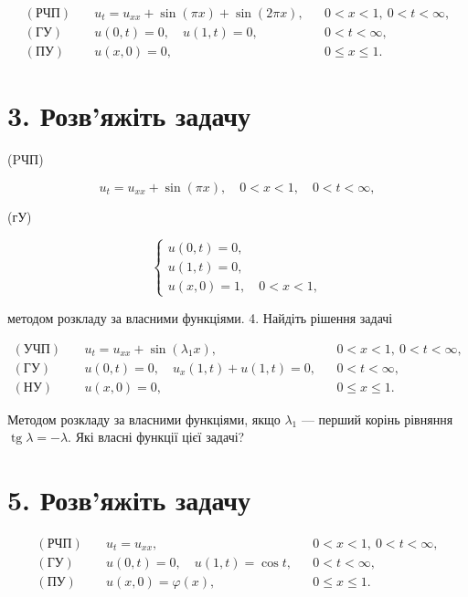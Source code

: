 \documentclass[
  ukrainian,
]{article}
\begin{document}
\[
\begin{aligned}
(\text{РЧП})\quad & u_t = u_{xx} + \sin(\pi x) + \sin(2\pi x), && 0 < x < 1,\ 0 < t < \infty,\\
(\text{ГУ})\quad & u(0,t)=0,\quad u(1,t)=0, && 0 < t < \infty,\\
(\text{ПУ})\quad & u(x,0)=0, && 0 \le x \le 1.
\end{aligned}
\]

\section{3. Розв'яжіть
задачу}\label{ux440ux43eux437ux432ux44fux436ux456ux442ux44c-ux437ux430ux434ux430ux447ux443}

(PЧП)

\[
u_t = u_{xx} + \sin(\pi x), \quad 0 < x < 1, \quad 0 < t < \infty,
\]

(гУ)

\[
\begin{cases} u(0, t) = 0, \\ u(1, t) = 0, \\ u(x, 0) = 1, \quad 0 < x < 1, \end{cases}
\]

методом розкладу за власними функціями. 4. Найдіть рішення задачі

\[
\begin{aligned}
(\text{УЧП})\quad & u_t = u_{xx} + \sin(\lambda_1 x), && 0 < x < 1,\ 0 < t < \infty, \\
(\text{ГУ})\quad & u(0,t) = 0,\quad u_x(1,t) + u(1,t) = 0, && 0 < t < \infty, \\
(\text{НУ})\quad & u(x,0) = 0, && 0 \leqslant x \leqslant 1.
\end{aligned}
\]

Методом розкладу за власними функціями, якщо \(\lambda_1\) --- перший
корінь рівняння \(\operatorname{tg}\lambda = -\lambda\). Які власні
функції цієї задачі?

\section{5. Розв'яжіть
задачу}\label{ux440ux43eux437ux432ux44fux436ux456ux442ux44c-ux437ux430ux434ux430ux447ux443-1}

\[
\begin{aligned}
(\text{РЧП})\quad & u_t = u_{xx}, && 0 < x < 1,\ 0 < t < \infty, \\
(\text{ГУ})\quad & u(0,t) = 0,\quad u(1,t) = \cos t, && 0 < t < \infty, \\
(\text{ПУ})\quad & u(x,0) = \varphi(x), && 0 \leqslant x \leqslant 1.
\end{aligned}
\]
\end{document}
